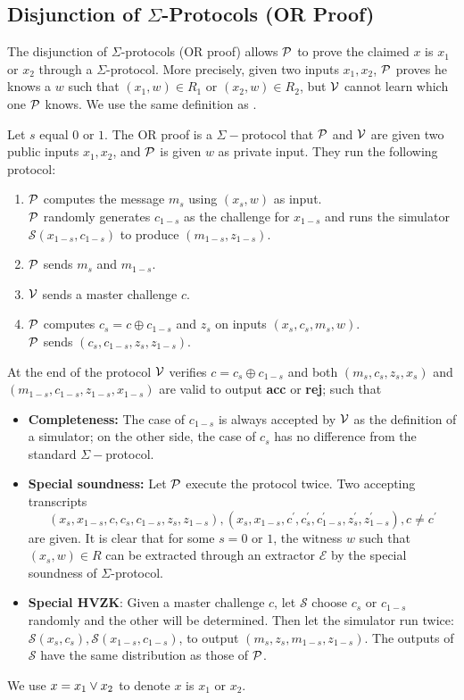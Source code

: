 \subsection{Disjunction of $\Sigma$-Protocols (OR Proof)}
The disjunction of $\Sigma$-protocols (OR proof) allows $\mathcal{P}$ to prove the claimed $x$ is $x_1$ or $x_2$ through a $\Sigma$-protocol. More precisely, given two inputs $x_1,x_2$, $\mathcal{P}$ proves he knows a $w$ such that $(x_1,w)\in{R_1}$ or $(x_2,w)\in{R_2}$, but $\mathcal{V}$ cannot learn which one $\mathcal{P}$ knows. We use the same definition as \cite{damgard10}.
\begin{definition}[OR Proof]
Let $s$ equal $0$ or $1$. The OR proof is a $\Sigma-$protocol that $\mathcal{P}$ and $\mathcal{V}$ are given two public inputs $x_1,x_2$, and $\mathcal{P}$ is given $w$ as private input. They run the following protocol:
\begin{enumerate}
    \item $\mathcal{P}$ computes the message $m_s$ using $(x_s,w)$ as input. \\
    $\mathcal{P}$ randomly generates $c_{1-s}$ as the challenge for $x_{1-s}$ and runs the simulator $\mathcal{S}(x_{1-s},c_{1-s})$ to produce $(m_{1-s},z_{1-s})$.
    \item $\mathcal{P}$ sends $m_s$ and $m_{1-s}$.
    \item $\mathcal{V}$ sends a master challenge $c$.
    \item $\mathcal{P}$ computes $c_s=c\oplus{c_{1-s}}$ and $z_s$ on inputs $(x_s,c_s,m_s,w)$. \\
    $\mathcal{P}$ sends $(c_s,c_{1-s},z_s,z_{1-s})$.
\end{enumerate}
At the end of the protocol $\mathcal{V}$ verifies $c=c_s\oplus{c_{1-s}}$ and both $(m_s,c_s,z_s,x_s)$ and $(m_{1-s},c_{1-s},z_{1-s},x_{1-s})$ are valid to output \textbf{acc} or \textbf{rej}; such that
\begin{itemize}
    \item \textbf{Completeness:} The case of $c_{1-s}$ is always accepted by $\mathcal{V}$ as the definition of a simulator; on the other side, the case of $c_s$ has no difference from the standard $\Sigma-$protocol.
    \item \textbf{Special soundness:} Let $\mathcal{P}$ execute the protocol twice. Two accepting transcripts
    \[ (x_s,x_{1-s},c,c_s,c_{1-s},z_s,z_{1-s}),(x_s,x_{1-s},c^\prime,c_s^\prime,c_{1-s}^\prime,z_s^\prime,z_{1-s}^\prime),c\ne{c^\prime} \] 
    are given. It is clear that for some $s=0$ or $1$, the witness $w$ such that $(x_s,w)\in{R}$ can be extracted through an extractor $\mathcal{E}$ by the special soundness of $\Sigma$-protocol.
    \item \textbf{Special HVZK}: Given a master challenge $c$, let $\mathcal{S}$ choose $c_s$ or $c_{1-s}$ randomly and the other will be determined. Then let the simulator run twice: $\mathcal{S}(x_s,c_s),\mathcal{S}(x_{1-s},c_{1-s})$, to output $(m_s,z_s,m_{1-s},z_{1-s})$. The outputs of $\mathcal{S}$ have the same distribution as those of $\mathcal{P}$.
\end{itemize}
\end{definition}
We use $x={x_1\lor{x_2}}$ to denote $x$ is $x_1$ or $x_2$.

